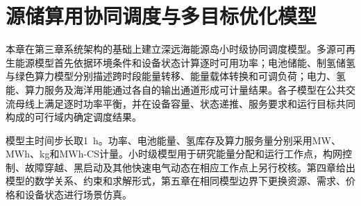 \setcounter{chapter}{3}
\chapter{源储算用协同调度与多目标优化模型}
\label{chap:model}

本章在第三章系统架构的基础上建立深远海能源岛小时级协同调度模型。多源可再生能源模型首先依据环境条件和设备状态计算逐时可用功率；电池储能、制氢储氢与绿色算力模型分别描述跨时段能量转移、能量载体转换和可调负荷；电力、氢能、算力服务及海洋用能通过各自的输出通道形成可计量结果。各子模型在公共交流母线上满足逐时功率平衡，并在设备容量、状态递推、服务要求和运行目标共同构成的可行域内确定调度结果。

模型主时间步长取1~h。功率、电池能量、氢库存及算力服务量分别采用MW、MWh、kg和MWh-CS计量。小时级模型用于研究能量分配和运行工作点，构网控制、故障穿越、黑启动及其他快速电气动态在相应工作点上另行校核。第四章给出模型的数学关系、约束和求解形式，第五章在相同模型边界下更换资源、需求、价格和设备状态进行场景仿真。











